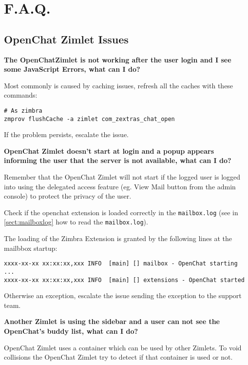 \section{F.A.Q.}
\label{sect:faq}

    \subsection[Zimlet Issues]{OpenChat Zimlet Issues}

    \textbf{The OpenChatZimlet is not working after the user login and I see some JavaScript Errors, what can I do?}

        Most commonly is caused by caching issues, refresh all the caches with these commands:
        \begin{verbatim}
# As zimbra
zmprov flushCache -a zimlet com_zextras_chat_open
        \end{verbatim}
        If the problem persists, escalate the issue.

    \textbf{OpenChat Zimlet doesn’t start at login and a popup appears informing the user that the server is not
    available, what can I do?}

\begin{comment}
TIP:
\end{comment}
        \begin{info}
            Remember that the OpenChat Zimlet will not start if the logged user is logged into using the delegated access
            feature (eg. View Mail button from the admin console) to protect the privacy of the user.
        \end{info}

        Check if the openchat extension is loaded correctly in the \verb+mailbox.log+ (see in \autoref{sect:mailboxlog}
        how to read the \verb+mailbox.log+).

        The loading of the Zimbra Extension is granted by the following lines at the mailbbox startup:
        \begin{verbatim}
xxxx-xx-xx xx:xx:xx,xxx INFO  [main] [] mailbox - OpenChat starting ...
xxxx-xx-xx xx:xx:xx,xxx INFO  [main] [] extensions - OpenChat started
        \end{verbatim}
        Otherwise an exception, escalate the issue sending the exception to the support team.

    \textbf{Another Zimlet is using the sidebar and a user can not see the OpenChat's buddy list, what can I do?}

        OpenChat Zimlet uses a container which can be used by other Zimlets. To void collisions the OpenChat Zimlet try
        to detect if that container is used or not.

